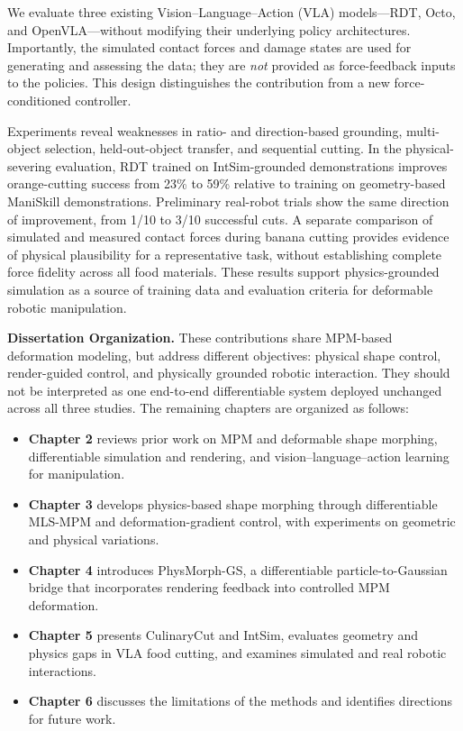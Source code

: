     We evaluate three existing Vision--Language--Action (VLA) models---RDT, Octo, and OpenVLA---without modifying their underlying policy architectures. Importantly, the simulated contact forces and damage states are used for generating and assessing the data; they are \emph{not} provided as force-feedback inputs to the policies. This design distinguishes the contribution from a new force-conditioned controller.
    
    Experiments reveal weaknesses in ratio- and direction-based grounding, multi-object selection, held-out-object transfer, and sequential cutting. In the physical-severing evaluation, RDT trained on IntSim-grounded demonstrations improves orange-cutting success from 23\% to 59\% relative to training on geometry-based ManiSkill demonstrations. Preliminary real-robot trials show the same direction of improvement, from 1/10 to 3/10 successful cuts. A separate comparison of simulated and measured contact forces during banana cutting provides evidence of physical plausibility for a representative task, without establishing complete force fidelity across all food materials. These results support physics-grounded simulation as a source of training data and evaluation criteria for deformable robotic manipulation.

\noindent\textbf{Dissertation Organization.}
    These contributions share MPM-based deformation modeling, but address different objectives: physical shape control, render-guided control, and physically grounded robotic interaction. They should not be interpreted as one end-to-end differentiable system deployed unchanged across all three studies. The remaining chapters are organized as follows:
    \begin{itemize}
        \item \textbf{Chapter 2} reviews prior work on MPM and deformable shape morphing, differentiable simulation and rendering, and vision--language--action learning for manipulation.
        \item \textbf{Chapter 3} develops physics-based shape morphing through differentiable MLS-MPM and deformation-gradient control, with experiments on geometric and physical variations.
        \item \textbf{Chapter 4} introduces PhysMorph-GS, a differentiable particle-to-Gaussian bridge that incorporates rendering feedback into controlled MPM deformation.
        \item \textbf{Chapter 5} presents CulinaryCut and IntSim, evaluates geometry and physics gaps in VLA food cutting, and examines simulated and real robotic interactions.
        \item \textbf{Chapter 6} discusses the limitations of the methods and identifies directions for future work.
    \end{itemize}
    